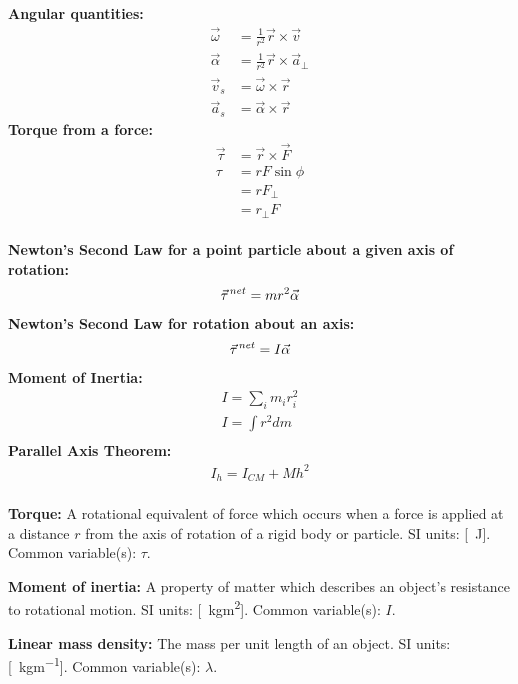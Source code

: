 \newpage
\begin{importantEquations}
\medskip
\begin{multicols}{2}
\textbf{Angular quantities:}
\begin{align*}
\vec\omega &= \frac{1}{r^2}\vec r \times \vec v\\
\vec\alpha &= \frac{1}{r^2}\vec r \times \vec a_\perp\\
\vec v_s &= \vec \omega \times \vec r\nonumber\\
\vec a_s&= \vec \alpha \times \vec r
\end{align*}
\textbf{Torque from a force:}
\begin{align*}
\vec\tau &= \vec r \times \vec F\\
\tau &= rF\sin\phi\\
&=rF_\perp\\
&=r_\perp F
\end{align*}
\columnbreak
\\
\textbf{Newton's Second Law for a point particle about a given axis of rotation:}
\begin{align*}
\pvec \tau^{net} = mr^2 \vec\alpha
\end{align*}
\textbf{Newton's Second Law for rotation about an axis:}
\begin{align*}
\pvec \tau^{net} = I\vec\alpha
\end{align*}
\textbf{Moment of Inertia:}
\begin{align*}
I = \sum_i m_ir_i^2\\
I = \int r^2 dm\\
\end{align*}
\textbf{Parallel Axis Theorem:}
\begin{align*}
I_h = I_{CM} + Mh^2\\
\end{align*}
\medskip
\end{multicols}
\end{importantEquations}


\begin{definitions}
	
	\textbf{Torque:} A rotational equivalent of force which occurs when a force is applied at a distance $r$ from the axis of rotation of a rigid body or particle. SI units: [\SI{}{J}]. Common variable(s): $\tau$.
	\medskip
	
	\item \textbf{Moment of inertia:} A property of matter which describes an object's resistance to rotational motion. SI units: [\SI{}{kgm^2}]. Common variable(s): $I$.
	\medskip
	
	\item \textbf{Linear mass density:} The mass per unit length of an object. SI units: [\SI{}{kgm^{-1}}]. Common variable(s): $\lambda$.
	\medskip
	
\end{definitions}

